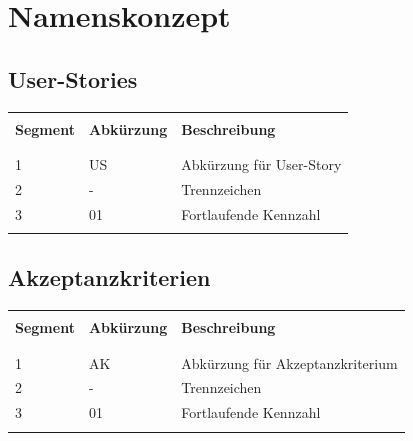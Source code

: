 \section{Namenskonzept}
\subsection{User-Stories}
\begin{table}[htp]
  \begin{tabularx}{\textwidth}{l l X}\hline \\
  \textbf{Segment} & \textbf{Abkürzung} & \textbf{Beschreibung} \\ \\\hline \\
  1 & US & Abkürzung für User-Story \\
  2 & - & Trennzeichen \\
  3 & 01 & Fortlaufende Kennzahl \\
  \\\hline
  \end{tabularx}
\end{table}
\subsection{Akzeptanzkriterien}
\begin{table}[htp]
  \begin{tabularx}{\textwidth}{l l X}\hline \\
    \textbf{Segment} & \textbf{Abkürzung} & \textbf{Beschreibung} \\ \\\hline \\
    1 & AK & Abkürzung für Akzeptanzkriterium \\
    2 & - & Trennzeichen \\
    3 & 01 & Fortlaufende Kennzahl \\
    \\\hline
  \end{tabularx}
\end{table}
